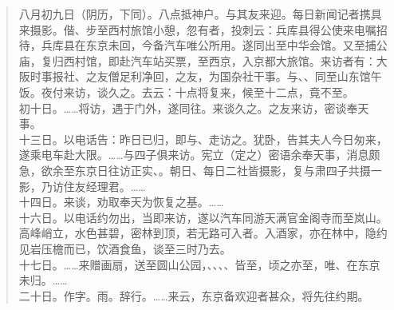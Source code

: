 \begin{quote}
	八月初九日（阴历，下同）。八点抵神户。与其友来迎。每日新闻记者携具来摄影。偕、步至西村旅馆小憩，忽有者，投刺云：兵库县得公使来电嘱招待，兵库县在东京未回，今备汽车唯公所用。遂同出至中华会馆。又至捕公庙，复归西村馆，即赴汽车站买票，至西京，入京都大旅馆。来访者有：大阪时事报社、之友僧足利净回，之友，为国杂社干事。与、、同至山东馆午饭。夜付来访，谈久之。去云：十点将复来，候至十二点，竟不至。\\

初十日。……将访，遇于门外，遂同往。来谈久之。之友来访，密谈奉天事。\\

十三日。以电话告：昨日已归，即与、走访之。犹卧，告其夫人今日匆来，遂乘电车赴大限。……与四子俱来访。宪立（定之）密语余奉天事，消息颇急，欲余至东京日往访正实、。朝日、每日二社皆摄影，复与肃四子共摄一影，乃访住友经理君。……\\

十四日。来谈，劝取奉天为恢复之基。……\\

十六日。以电话约勿出，当即来访，遂以汽车同游天满官金阁寺而至岚山。高峰峭立，水色甚碧，密林到顶，若无路可入者。入酒家，亦在林中，隐约见岩压檐而已，饮酒食鱼，谈至三时乃去。\\

十七日。……来赠画扇，送至圆山公园，、、、、皆至，顷之亦至，唯、在东京未归。……\\

二十日。作字。雨。辞行。……来云，东京备欢迎者甚众，将先往约期。\\


\end{quote}
